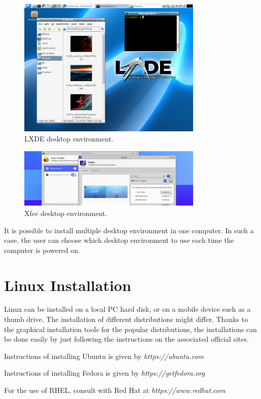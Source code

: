 \begin{figure}
	\centering
	\includegraphics[width=250pt]{chapters/ch_brief_introduction_to_linux/figures/lxde_demo.png}
	\caption{LXDE desktop environment.} \label{chbriefintroductiontolinux:fig:lxdedemo}
\end{figure}

\begin{figure}
	\centering
	\includegraphics[width=250pt]{chapters/ch_brief_introduction_to_linux/figures/xfce_demo.png}
	\caption{Xfce desktop environment.} \label{chbriefintroductiontolinux:fig:xfcedemo}
\end{figure}

It is possible to install multiple desktop environment in one computer. In such a case, the user can choose which desktop environment to use each time the computer is powered on.

\section{Linux Installation}

Linux can be installed on a local PC hard disk, or on a mobile device such as a thumb drive. The installation of different distributions might differ. Thanks to the graphical installation tools for the popular distributions, the installations can be done easily by just following the instructions on the associated official sites.

Instructions of installing Ubuntu is given by \textit{https://ubuntu.com}

Instructions of installing Fedora is given by \textit{https://getfedora.org}

For the use of RHEL, consult with Red Hat at \textit{https://www.redhat.com}
